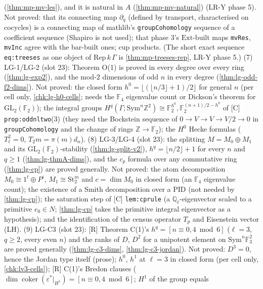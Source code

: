 \begin{remark}
  (\ref{thm:mp-mv-les}), and it is natural in $A$ (\ref{thm:mp-mv-natural}) (LR-Y phase 5).  Not proved: that its connecting
  map $\partial_q$ (defined by transport, characterised on cocycles) is a connecting map of mathlib's \texttt{groupCohomology}
  sequence of a coefficient sequence (Shapiro is not used); that phase 3's $\mathrm{Ext}$-built maps \texttt{mvRes},
  \texttt{mvInc} agree with the bar-built ones; cup products.  (The short exact sequence \texttt{eq:treeses} as one object of $\mathrm{Rep}\,k\,\Gamma$ is
  \ref{thm:mp-treeses-rep}, LR-Y phase 5.)  (7) LG-1/LG-2 (slot 23): Theorem O(1) is proved in every degree over every ring
  (\ref{thm:lg-exp2}), and the mod-$2$ dimensions of odd $n$ in every degree (\ref{thm:lg-odd-f2-dims}).  Not proved: the closed form
  $h^0=\lfloor(\lfloor n/3\rfloor+1)/2\rfloor$ for general $n$ (per cell only, \ref{chk:lg-h0-cells}; needs the $\mathbb F_4$ eigenvalue
  count or Dickson's theorem for $\mathrm{GL}_2(\mathbb F_2)$); the integral groups $H^q(\Gamma;\mathrm{Sym}^n\mathbb Z^2)\cong\mathbb F_2^{h^0},
  \mathbb F_2^{(n+1)/2-h^0}$ of [C] \texttt{prop:oddnltwo}(3) (they need the Bockstein sequence of $0\to V\to V\to V/2\to0$ in
  \texttt{groupCohomology} and the change of rings $\mathbb Z\to\mathbb F_2$); the $H^0$ Hecke formulas ($T_\ell^2=0$, $T_2m=\pi(m)d_n$).  (8) LG-3/LG-4 (slot 23): the splitting $M=M_0\oplus M_1$ and its
  $\mathrm{GL}_2(\mathbb F_2)$-stability (\ref{thm:lg-split-v2}), $h^q=\lfloor n/2\rfloor+1$ for every $n$ and $q\ge1$ (\ref{thm:lg-thmA-dims}),
  and the $c_p$ formula over any commutative ring (\ref{thm:lg-cp}) are proved generally.  Not proved: the atom decomposition
  $M_0\cong1^t\oplus P^i$, $M_1\cong\mathrm{St}_2^m$ and $c=\dim M_0$ in closed form (an $\mathbb F_4$ eigenvalue count); the existence of a Smith decomposition over a PID
  (not needed by \ref{thm:lg-cp}); the saturation step of [C] \texttt{lem:cprule} (a $\mathbb Q_\ell$-eigenvector scaled to a primitive
  $e_0\in N$; \ref{thm:lg-cp} takes the primitive integral eigenvector as a hypothesis); and the identification of the census
  operator $T_p$ and Eisenstein vector (LH).  (9) LG-C3 (slot 23): [R] Theorem C(1)'s $h^q=[n\equiv0,4\bmod6]$ ($\ell=3$, $q\ge2$,
  every even $n$) and the ranks of $D$, $D^2$ for a unipotent element on $\mathrm{Sym}^n\mathbb F_3^2$ are proved generally
  (\ref{thm:lg-c3-dims}, \ref{thm:lg-c3-jordan}).  Not proved: $D^3=0$, hence the Jordan type itself (prose); $h^0$, $h^1$ at $\ell=3$ in closed form (per cell only,
  \ref{chk:lv3-cells}); [R] C(1)'s Bredon clauses ($\dim\operatorname{coker}(\varepsilon^*|_{H^1})=[n\equiv0,4\bmod6]$; $H^1$ of the group equals

\end{remark}
